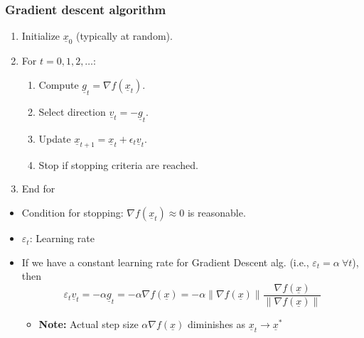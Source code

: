     \subsubsection{Gradient descent algorithm}
    \begin{definition}
        \begin{enumerate}
            \item Initialize $\underline{x}_0$ (typically at random).
            \item For $t = 0, 1, 2, \dots$:
            \begin{enumerate}
                \item Compute $\underline{g}_t = \nabla f(\underline{x}_t)$.
                \item Select direction $\underline{v}_t = -\underline{g}_t$.
                \item Update $\underline{x}_{t+1} = \underline{x}_t + \epsilon_t \underline{v}_t$.
                \item Stop if stopping criteria are reached.
            \end{enumerate}
            \item End for
        \end{enumerate}
        \vspace{1em}

        \begin{itemize}
            \item Condition for stopping: \( \nabla f(\underline{x}_t) \approx 0 \) is reasonable.

            \item \( \varepsilon_t \): Learning rate

            \item If we have a constant learning rate for Gradient Descent alg. (i.e., \( \varepsilon_t = \alpha \ \forall t \)), then
            \[
            \varepsilon_t \underline{v}_t = -\alpha \underline{g}_t = -\alpha \nabla f(\underline{x}) = -\alpha \|\nabla f(\underline{x})\| \frac{\nabla f(\underline{x})}{\|\nabla f(\underline{x})\|}
            \]
            \begin{itemize}
                \item \textbf{Note:} Actual step size $\alpha \nabla f(\underline{x})$ diminishes as \( \underline{x}_t \rightarrow \underline{x}^* \)
            \end{itemize}
        \end{itemize}
    \end{definition}

